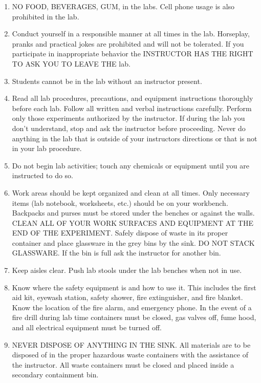 \documentclass[]{book}
\providecommand{\tightlist}{%
  \setlength{\itemsep}{0pt}\setlength{\parskip}{0pt}}
\theoremstyle{definition}
\theoremstyle{definition}
\theoremstyle{definition}
\theoremstyle{remark}
\begin{document}
\begin{enumerate}
\def\labelenumi{\arabic{enumi}.}
\tightlist
\item
  NO FOOD, BEVERAGES, GUM, in the labs. Cell phone usage is also
  prohibited in the lab.
\item
  Conduct yourself in a responsible manner at all times in the lab.
  Horseplay, pranks and practical jokes are prohibited and will not be
  tolerated. If you participate in inappropriate behavior the INSTRUCTOR
  HAS THE RIGHT TO ASK YOU TO LEAVE THE lab.
\item
  Students cannot be in the lab without an instructor present.
\item
  Read all lab procedures, precautions, and equipment instructions
  thoroughly before each lab. Follow all written and verbal instructions
  carefully. Perform only those experiments authorized by the
  instructor. If during the lab you don't understand, stop and ask the
  instructor before proceeding. Never do anything in the lab that is
  outside of your instructors directions or that is not in your lab
  procedure.
\item
  Do not begin lab activities; touch any chemicals or equipment until
  you are instructed to do so.
\item
  Work areas should be kept organized and clean at all times. Only
  necessary items (lab notebook, worksheets, etc.) should be on your
  workbench. Backpacks and purses must be stored under the benches or
  against the walls. CLEAN ALL OF YOUR WORK SURFACES AND EQUIPMENT AT
  THE END OF THE EXPERIMENT. Safely dispose of waste in its proper
  container and place glassware in the grey bins by the sink. DO NOT
  STACK GLASSWARE. If the bin is full ask the instructor for another
  bin.
\item
  Keep aisles clear. Push lab stools under the lab benches when not in
  use.
\item
  Know where the safety equipment is and how to use it. This includes
  the first aid kit, eyewash station, safety shower, fire extinguisher,
  and fire blanket. Know the location of the fire alarm, and emergency
  phone. In the event of a fire drill during lab time containers must be
  closed, gas valves off, fume hood, and all electrical equipment must
  be turned off.
\item
  NEVER DISPOSE OF ANYTHING IN THE SINK. All materials are to be
  disposed of in the proper hazardous waste containers with the
  assistance of the instructor. All waste containers must be closed and
  placed inside a secondary containment bin.

\end{enumerate}
\end{document}
